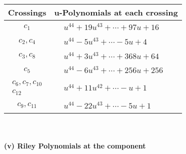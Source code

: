 \documentclass[1p]{elsarticle_modified}
\theoremstyle{definition}
\begin{document}
\begin{tabular}{m{50pt}|m{274pt}}
Crossings & \hspace{64pt}u-Polynomials at each crossing \\
\hline $$\begin{aligned}c_{1}\end{aligned}$$&$\begin{aligned}
&u^{44}+19 u^{43}+\cdots+97 u+16
\end{aligned}$\\
\hline $$\begin{aligned}c_{2},c_{4}\end{aligned}$$&$\begin{aligned}
&u^{44}-5 u^{43}+\cdots-5 u+4
\end{aligned}$\\
\hline $$\begin{aligned}c_{3},c_{8}\end{aligned}$$&$\begin{aligned}
&u^{44}+3 u^{43}+\cdots+368 u+64
\end{aligned}$\\
\hline $$\begin{aligned}c_{5}\end{aligned}$$&$\begin{aligned}
&u^{44}-6 u^{43}+\cdots+256 u+256
\end{aligned}$\\
\hline $$\begin{aligned}c_{6},c_{7},c_{10}\\c_{12}\end{aligned}$$&$\begin{aligned}
&u^{44}+11 u^{42}+\cdots- u+1
\end{aligned}$\\
\hline $$\begin{aligned}c_{9},c_{11}\end{aligned}$$&$\begin{aligned}
&u^{44}-22 u^{43}+\cdots-5 u+1
\end{aligned}$\\
\hline
\end{tabular}\\~\\
\newpage\renewcommand{\arraystretch}{1}
\flushleft \textbf{(v) Riley Polynomials at the component}\newline \\
\end{document}

